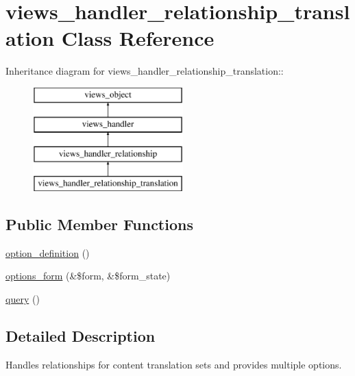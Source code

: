 \hypertarget{classviews__handler__relationship__translation}{
\section{views\_\-handler\_\-relationship\_\-translation Class Reference}
\label{classviews__handler__relationship__translation}
}
Inheritance diagram for views\_\-handler\_\-relationship\_\-translation::\begin{figure}[H]
\begin{center}
\leavevmode
\includegraphics[height=4cm]{classviews__handler__relationship__translation}
\end{center}
\end{figure}
\subsection*{Public Member Functions}
\begin{CompactItemize}
\item 
\hyperlink{classviews__handler__relationship__translation_0bf8fe73b167b63fd5ac38bd5e8b1efe}{option\_\-definition} ()
\item 
\hyperlink{classviews__handler__relationship__translation_ca4668f3619b0fc6182e12cbaf38b633}{options\_\-form} (\&\$form, \&\$form\_\-state)
\item 
\hyperlink{classviews__handler__relationship__translation_f1e8ba159a9b04199ff03cad304ca1e4}{query} ()
\end{CompactItemize}


\subsection{Detailed Description}
Handles relationships for content translation sets and provides multiple options. 


